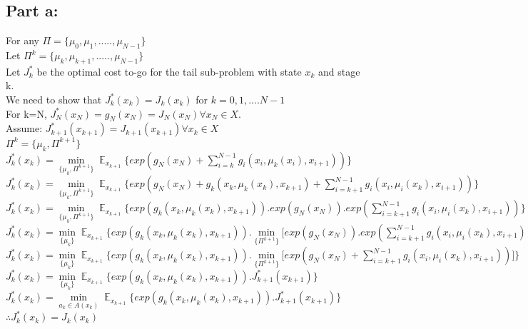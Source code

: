 \documentclass{article}
\begin{document}
\subsection{Part a:}
For any $\Pi=\{\mu_0,\mu_1,.....,\mu_{N-1}\}$\\
Let $\Pi^k=\{\mu_k,\mu_{k+1},.....,\mu_{N-1}\}$\\
Let $J_k^*$ be the optimal cost to-go for the tail sub-problem with state $x_k$ and stage k.\\
We need to show that $J_k^*(x_k)=J_k(x_k)$ for $k=0,1,....N-1$\\
For k=N, $J_N^*(x_N)=g_N(x_N)=J_N(x_N)  \forall x_N \in X. $\\
Assume: $J_{k+1}^*(x_{k+1})=J_{k+1}(x_{k+1})  \forall x_k \in X$\\
$\Pi^k = \Big\{ \mu_k,\Pi^{k+1} \Big\}$\\
$J_k^*(x_k)=\min\limits_{\{\mu_k,\Pi^{k+1}\}} \displaystyle \mathop{\mathbb{E}}_{x_{k+1}} \Big\{ exp(g_N(x_N)+\sum_{i=k}^{N-1}g_i(x_i,\mu_k(x_i),x_{i+1})         )\Big\}$\\
$J_k^*(x_k)=\min\limits_{\{\mu_k,\Pi^{k+1}\}} \displaystyle \mathop{\mathbb{E}}_{x_{k+1}} \Big\{ exp(g_N(x_N)+g_k(x_k,\mu_k(x_k),x_{k+1})+\sum_{i=k+1}^{N-1}g_i(x_i,\mu_i(x_k),x_{i+1})  )        \Big\}$\\
$J_k^*(x_k)=\min\limits_{\{\mu_k,\Pi^{k+1}\}} \displaystyle \mathop{\mathbb{E}}_{x_{k+1}} \Big\{ exp(g_k(x_k,\mu_k(x_k),x_{k+1})).exp(g_N(x_N)).exp(\sum_{i=k+1}^{N-1}g_i(x_i,\mu_i(x_k),x_{i+1})  )       \Big\}$\\
$J_k^*(x_k)=\min\limits_{\{\mu_k\}} \displaystyle \mathop{\mathbb{E}}_{x_{k+1}} \Big\{ exp(g_k(x_k,\mu_k(x_k),x_{k+1})).\min\limits_{\{\Pi^{k+1}\}}\big[exp(g_N(x_N)).exp(\sum_{i=k+1}^{N-1}g_i(x_i,\mu_i(x_k),x_{i+1})  ) \big]      \Big\}$\\
$J_k^*(x_k)=\min\limits_{\{\mu_k\}} \displaystyle \mathop{\mathbb{E}}_{x_{k+1}} \Big\{ exp(g_k(x_k,\mu_k(x_k),x_{k+1})).\min\limits_{\{\Pi^{k+1}\}}\big[exp(g_N(x_N)+\sum_{i=k+1}^{N-1}g_i(x_i,\mu_i(x_k),x_{i+1})  ) \big]      \Big\}$\\
$J_k^*(x_k)=\min\limits_{\{\mu_k\}} \displaystyle \mathop{\mathbb{E}}_{x_{k+1}} \Big\{ exp(g_k(x_k,\mu_k(x_k),x_{k+1})).J_{k+1}^*(x_{k+1})     \Big\}$\\
$J_k^*(x_k)=\min\limits_{a_k \in A(x_k)} \displaystyle \mathop{\mathbb{E}}_{x_{k+1}} \Big\{ exp(g_k(x_k,\mu_k(x_k),x_{k+1})).J_{k+1}^*(x_{k+1})     \Big\}$\\
$\therefore J_k^*(x_k)= J_k(x_k)$\\
 
\end{document}
